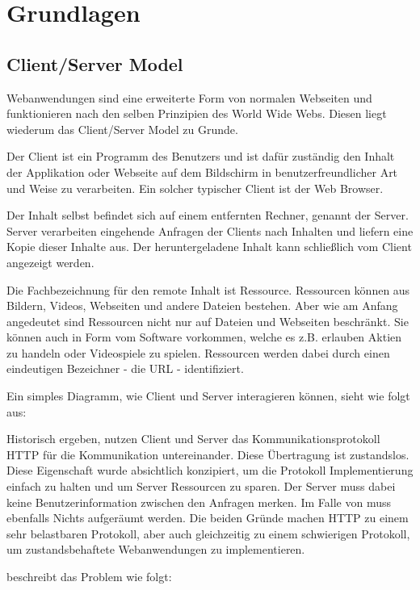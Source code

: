 \chapter{Grundlagen}

\section{Client/Server Model}
\label{sec:client_server}

Webanwendungen sind eine erweiterte Form von normalen Webseiten und funktionieren nach den selben Prinzipien des World Wide Webs. Diesen liegt wiederum das Client/Server Model zu Grunde.

Der Client ist ein Programm des Benutzers und ist dafür zuständig den Inhalt der Applikation oder Webseite auf dem Bildschirm in benutzerfreundlicher Art und Weise zu verarbeiten. Ein solcher typischer Client ist der Web Browser.

Der Inhalt selbst befindet sich auf einem entfernten Rechner, genannt der Server. Server verarbeiten eingehende Anfragen der Clients nach Inhalten und liefern eine Kopie dieser Inhalte aus. Der heruntergeladene Inhalt kann schließlich vom Client angezeigt werden.

Die Fachbezeichnung für den remote Inhalt ist Ressource. Ressourcen können aus Bildern, Videos, Webseiten und andere Dateien bestehen. Aber wie am Anfang angedeutet sind Ressourcen nicht nur auf Dateien und Webseiten beschränkt. Sie können auch in Form vom Software vorkommen, welche es z.B. erlauben Aktien zu handeln oder Videospiele zu spielen. Ressourcen werden dabei durch einen eindeutigen Bezeichner - die URL - identifiziert.

Ein simples Diagramm, wie Client und Server interagieren können, sieht wie folgt aus:

Historisch ergeben, nutzen Client und Server das Kommunikationsprotokoll HTTP für die Kommunikation untereinander. Diese Übertragung ist zustandslos. Diese Eigenschaft wurde absichtlich konzipiert, um die Protokoll Implementierung einfach zu halten und um Server Ressourcen zu sparen. Der Server muss dabei keine Benutzerinformation zwischen den Anfragen merken. Im Falle von muss ebenfalls Nichts aufgeräumt werden. Die beiden Gründe machen HTTP zu einem sehr belastbaren Protokoll, aber auch gleichzeitig zu einem schwierigen Protokoll, um zustandsbehaftete Webanwendungen zu implementieren.

\cite[Background]{Parikh:2015} beschreibt das Problem wie folgt:

